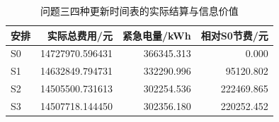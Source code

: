 \begin{table}[H]
\centering\small
\caption{问题三四种更新时间表的实际结算与信息价值}\label{tab:q3-schedule-comparison}
\setlength{\tabcolsep}{4pt}
\begin{tabular}{lrrr}
\toprule
安排 & 实际总费用/元 & 紧急电量/kWh & 相对S0节费/元 \\
\midrule
S0 & 14727970.596431 & 366345.313 & 0.000 \\
S1 & 14632849.794731 & 332290.996 & 95120.802 \\
S2 & 14505500.731613 & 302254.536 & 222469.865 \\
S3 & 14507718.144450 & 302356.180 & 220252.452 \\
\bottomrule
\end{tabular}
\end{table}
